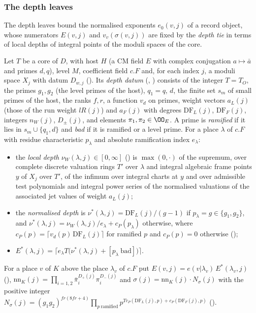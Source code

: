\subsubsection{The depth leaves}\label{sec:pf:onto2:depth}

The depth leaves bound the normalised exponents $e_0(v,j)$ of a record object, whose numerators $E(v,j)$ and
$v_v(\sigma(v,j))$ are fixed by the \emph{depth tie} in terms of local depths of integral points of the moduli spaces of the
core.

\begin{definition}\label{pf:onto2:depdat}
Let $T$ be a core of $D$, with host $H$ (a CM field $E$ with complex conjugation $a\mapsto\bar a$ and primes $d,q$), level $M$,
coefficient field $c.F$ and, for each index $j$, a moduli space $X_j$ with datum $D_{w,j}$ (). Its
\emph{depth datum} (, ) consists of the integer $T=T_O$,
the primes $g_1,g_2$ (the level primes of the host), $q_1=q$, $d$, the finite set $s_m$ of small primes of the host, the ranks
$f,r$, a function $v_d$ on primes, weight vectors $a_L(j)$ (those of the run weight $lR(j)$) and $a_F(j)$ with degrees
$\mathrm{DF}_L(j)$, $\mathrm{DF}_F(j)$, integers $n_W(j)$, $D_\pm(j)$, and elements $\pi_1,\pi_2\in\OO_E$. A prime is
\emph{ramified} if it lies in $s_m\cup\{q_1,d\}$ and \emph{bad} if it is ramified or a level prime. For a place $\lambda$ of $c.F$
with residue characteristic $p_\lambda$ and absolute ramification index $e_\lambda$:
\begin{itemize}
\item the \emph{local depth} $\nu_W(\lambda,j)\in[0,\infty]$ () is $\max(0,\cdot)$ of the supremum,
  over complete discrete valuation rings $T'$ over $\lambda$ and integral algebraic frame points $y$ of $X_j$ over $T'$, of the
  infimum over integral charts at $y$ and over admissible test polynomials and integral power series of the normalised
  valuations of the associated jet values of weight $a_L(j)$;
\item the \emph{normalised depth} is $\nu^*(\lambda,j)=\mathrm{DF}_L(j)/(g-1)$ if $p_\lambda=g\in\{g_1,g_2\}$, and
  $\nu^*(\lambda,j)=\nu_W(\lambda,j)/e_\lambda+c_P(p_\lambda)$ otherwise, where $c_P(p)=\lceil v_d(p)\,\mathrm{DF}_L(j)\rceil$ for
  ramified $p$ and $c_P(p)=0$ otherwise ();
\item $E^{*}(\lambda,j)=\bigl\lceil e_\lambda T\bigl(\nu^*(\lambda,j)+[p_\lambda\ \text{bad}]\bigr)\bigr\rceil$.
\end{itemize}
For a place $v$ of $K$ above the place $\lambda_v$ of $c.F$ put $E(v,j)=e(v|\lambda_v)\,E^{*}(\lambda_v,j)$
(), $\mathrm{nn}_K(j)=\prod_{i=1,2}\bar\pi_i^{D_+(j)}\pi_i^{D_-(j)}$ and
$\sigma(j)=\mathrm{nn}_K(j)\cdot N_\sigma(j)$ with the positive integer $N_\sigma(j)=(g_1g_2)^{fr(8fr+4)}\prod_{p\
\text{ramified}}p^{Tc_P(\mathrm{DF}_L(j),p)+c_P(\mathrm{DF}_F(j),p)}$ ().
\end{definition}


